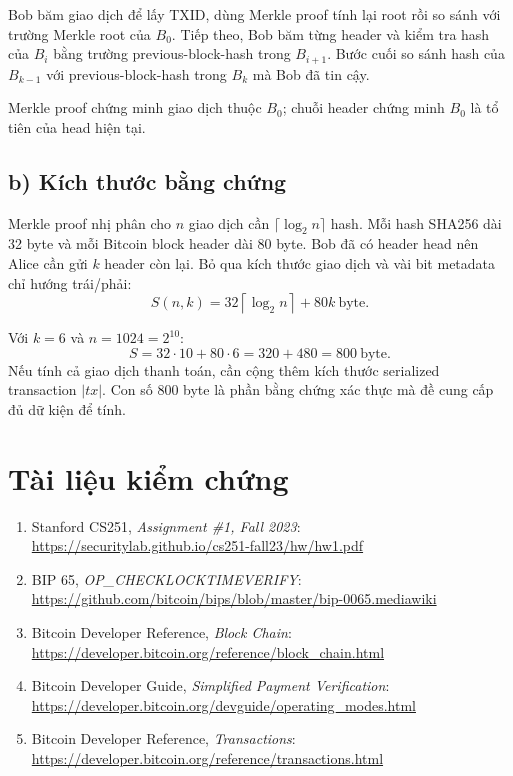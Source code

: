 \documentclass[12pt,a4paper]{article}
\begin{document}
Bob băm giao dịch để lấy TXID, dùng Merkle proof tính lại root rồi so sánh với
trường Merkle root của $B_0$. Tiếp theo, Bob băm từng header và kiểm tra hash
của $B_i$ bằng trường previous-block-hash trong $B_{i+1}$. Bước cuối so sánh
hash của $B_{k-1}$ với previous-block-hash trong $B_k$ mà Bob đã tin cậy.

Merkle proof chứng minh giao dịch thuộc $B_0$; chuỗi header chứng minh $B_0$
là tổ tiên của head hiện tại.

\subsection*{b) Kích thước bằng chứng}

Merkle proof nhị phân cho $n$ giao dịch cần
$\lceil\log_2 n\rceil$ hash. Mỗi hash SHA256 dài 32 byte và mỗi Bitcoin block
header dài 80 byte. Bob đã có header head nên Alice cần gửi $k$ header còn lại.
Bỏ qua kích thước giao dịch và vài bit metadata chỉ hướng trái/phải:
\[
  \boxed{S(n,k)=32\left\lceil\log_2 n\right\rceil+80k\ \text{byte}.}
\]

Với $k=6$ và $n=1024=2^{10}$:
\[
  S=32\cdot10+80\cdot6=320+480=\boxed{800\ \text{byte}}.
\]
Nếu tính cả giao dịch thanh toán, cần cộng thêm kích thước serialized
transaction $|tx|$. Con số 800 byte là phần bằng chứng xác thực mà đề cung cấp
đủ dữ kiện để tính.

\clearpage
\section*{Tài liệu kiểm chứng}

\begin{enumerate}
  \item Stanford CS251, \emph{Assignment \#1, Fall 2023}:\\
        \url{https://securitylab.github.io/cs251-fall23/hw/hw1.pdf}
  \item BIP 65, \emph{OP\_CHECKLOCKTIMEVERIFY}:\\
        \url{https://github.com/bitcoin/bips/blob/master/bip-0065.mediawiki}
  \item Bitcoin Developer Reference, \emph{Block Chain}:\\
        \url{https://developer.bitcoin.org/reference/block_chain.html}
  \item Bitcoin Developer Guide, \emph{Simplified Payment Verification}:\\
        \url{https://developer.bitcoin.org/devguide/operating_modes.html}
  \item Bitcoin Developer Reference, \emph{Transactions}:\\
        \url{https://developer.bitcoin.org/reference/transactions.html}
\end{enumerate}
\end{document}
